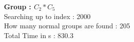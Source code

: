 \textbf{Group : $C_2*C_5$}\\
Searching up to index : 2000\\
How many normal groups are found : 205\\
Total Time in s : 830.3\\

